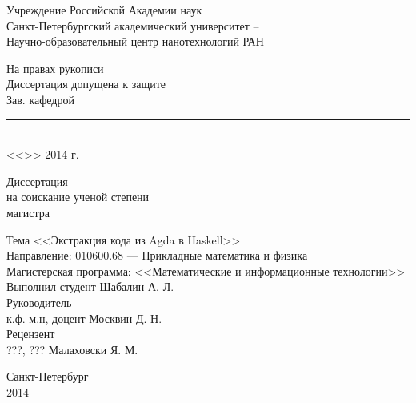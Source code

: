 \begin{titlepage}

\begin{center}
Учреждение Российской Академии наук\\
Санкт-Петербургский академический университет --\\
Научно-образовательный центр нанотехнологий РАН
\end{center}

\vspace{1cm}

\begin{flushright}
\begin{minipage}{0.5\textwidth}
\begin{center}
На правах рукописи\\[.5cm]
Диссертация допущена к защите\\
Зав. кафедрой\\[.3cm]
\rule{7cm}{.5pt}\\
<<\hspace{.8cm}>> \underline{\hspace{3.5cm}} 2014 г.\\
\end{center}
\end{minipage}
\end{flushright}

\vspace{1cm}

\begin{center}
Диссертация\\
на соискание ученой степени\\
магистра
\end{center}

\begin{flushleft}
Тема <<Экстракция кода из Agda в Haskell>>\\[.5cm]

Направление: 010600.68 --- Прикладные математика и физика\\[.5cm]

Магистерская программа: <<Математические и информационные технологии>>\\[1cm]

Выполнил студент \hfill Шабалин А. Л.\\[.5cm]

Руководитель\\
к.ф.-м.н, доцент \hfill Москвин Д. Н.\\[.5cm]

Рецензент\\
???, ??? \hfill Малаховски Я. М.
\end{flushleft}

\vfill

\begin{center}
Санкт-Петербург\\
2014
\end{center}

\end{titlepage}
